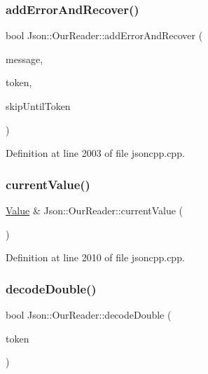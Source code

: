 \subsubsection{\texorpdfstring{add\+Error\+And\+Recover()}{addErrorAndRecover()}}
{\footnotesize\ttfamily bool Json\+::\+Our\+Reader\+::add\+Error\+And\+Recover (\begin{DoxyParamCaption}\item[{const \hyperlink{config_8h_a1e723f95759de062585bc4a8fd3fa4be}{J\+S\+O\+N\+C\+P\+P\+\_\+\+S\+T\+R\+I\+NG} \&}]{message,  }\item[{\hyperlink{class_json_1_1_our_reader_1_1_token}{Token} \&}]{token,  }\item[{\hyperlink{class_json_1_1_our_reader_a15116f7276ddf1e7a2cc3cbefa884dcc}{Token\+Type}}]{skip\+Until\+Token }\end{DoxyParamCaption})\hspace{0.3cm}{\ttfamily [private]}}



Definition at line 2003 of file jsoncpp.\+cpp.

\hypertarget{class_json_1_1_our_reader_a2acd5b1d53e7d7e17c21ff8e96edc09d}{}\label{class_json_1_1_our_reader_a2acd5b1d53e7d7e17c21ff8e96edc09d} 
\subsubsection{\texorpdfstring{current\+Value()}{currentValue()}}
{\footnotesize\ttfamily \hyperlink{class_json_1_1_value}{Value} \& Json\+::\+Our\+Reader\+::current\+Value (\begin{DoxyParamCaption}{ }\end{DoxyParamCaption})\hspace{0.3cm}{\ttfamily [private]}}



Definition at line 2010 of file jsoncpp.\+cpp.

\hypertarget{class_json_1_1_our_reader_a1d1c3b44f6720a0e7c39b5ae8de3981c}{}\label{class_json_1_1_our_reader_a1d1c3b44f6720a0e7c39b5ae8de3981c} 
\subsubsection{\texorpdfstring{decode\+Double()}{decodeDouble()}\hspace{0.1cm}{\footnotesize\ttfamily [1/2]}}
{\footnotesize\ttfamily bool Json\+::\+Our\+Reader\+::decode\+Double (\begin{DoxyParamCaption}\item[{\hyperlink{class_json_1_1_our_reader_1_1_token}{Token} \&}]{token }\end{DoxyParamCaption})\hspace{0.3cm}{\ttfamily [private]}}



